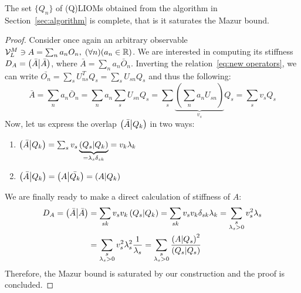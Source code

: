 \begin{proposition}
  The set \(\{Q_n\}\) of (Q)LIOMs obtained from the algorithm in Section~\ref{sec:algorithm} is complete,
  that is it saturates the Mazur bound. 
\label{prop:saturation}
\end{proposition}
\begin{proof}
  Consider once again an arbitrary observable \(\mathcal{V}_L^M \ni A = \sum_n a_n O_n,\; 
  (\forall n) (a_n \in \mathbb{R})\). We are interested in computing its stiffness \(D_A = \left(\bar{A} \middle| \bar{A}\right)\), 
  where \(\bar{A} = \sum_n a_n \bar{O}_n\). Inverting the relation~\eqref{eq:new operators}, we can write 
  \(\bar{O_n} = \sum_s U_{ns}^T Q_s = \sum_s U_{sn} Q_s\) and thus the following:
  \begin{equation*}
    \bar{A} = \sum_n a_n \bar{O}_n = \sum_n a_n \sum_s U_{sn} Q_s =
    \sum_s \underbrace{\left(\sum_n a_n U_{sn}\right)}_{v_s} Q_s = \sum_s v_s Q_s
  \end{equation*}
  Now, let us express the overlap \(\left(\bar{A} \middle| Q_k\right)\) in two ways:
  \begin{enumerate}
    \item \(\left(\bar{A} \middle| Q_k\right) = \sum_s v_s \underbrace{\left(Q_s \middle| Q_k\right)}_{=\lambda_s \delta_{sk}} = v_k \lambda_k\)
    \item \(\left(\bar{A} \middle| Q_k\right) = \left(A \middle| \bar{Q_k}\right) = \left(A \middle| Q_k\right)\)
  \end{enumerate}
  We are finally ready to make a direct calculation of stiffness of \(A\):
  \begin{align*}
    D_A = \left(\bar{A} \middle| \bar{A}\right) &= \sum_{sk} v_s v_k \left(Q_s \middle| Q_k\right) = \sum_{sk} v_s v_k \delta_{sk} \lambda_{k} = 
    \sum_{\substack{s\\\lambda_s > 0}} v_s^2 \lambda_s \\
    &= \sum_{\substack{s\\\lambda_s > 0}} v_s^2 \lambda_s^2 \frac{1}{\lambda_s} = 
    \sum_{\substack{s\\\lambda_s > 0}} \frac{\left(A \middle| Q_s\right)^2}{\left(Q_s \middle| Q_s\right)}
  \end{align*}
  Therefore, the Mazur bound is saturated by our construction and the proof is concluded.
\end{proof}

